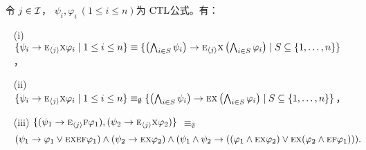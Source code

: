 \begin{lemma}~\label{lem:In2NI}
	令 $j\in {\cal I}$， $\psi_i,\varphi_i~(1\le i\le n)$为 $\textrm{CTL}$公式。有：
	\begin{itemize}
		\item[(i)] $\{\psi_i\rightarrow \textsc{e}_{{\langle{j}\rangle}} \textsc{x} \varphi_i \mid 1\le i\le n\}\equiv 
		\{\left(\bigwedge_{i\in S}\psi_i\right)\rightarrow \textsc{e}_{{\langle{j}\rangle}} \textsc{x} \left(\bigwedge_{i\in S}\varphi_i\right)\mid S\subseteq\{1,\dots, n\}\}$，
		
		\item[(ii)] $\{\psi_i\rightarrow \textsc{e}_{{\langle{j}\rangle}} \textsc{x} \varphi_i \mid 1\le i\le n\}\equiv_\emptyset
		\{\left(\bigwedge_{i\in S}\psi_i\right)\rightarrow \textsc{e} \textsc{x} \left(\bigwedge_{i\in S}\varphi_i\right)\mid S\subseteq\{1,\dots, n\}\}$，
		
		\item[(iii)] $\{(\psi_1 \rightarrow \textsc{e}_{{\langle{j}\rangle}}\textsc{f} \varphi_1), (\psi_2 \rightarrow \textsc{e}_{{\langle{j}\rangle}}\textsc{x} \varphi_2)\}$
		$\equiv_\emptyset$ 
		\begin{equation*}
			(\psi_1 \rightarrow \varphi_1 \vee \textsc{e} \textsc{x} \textsc{e} \textsc{f} \varphi_1)
			\wedge (\psi_2 \rightarrow \textsc{e} \textsc{x} \varphi_2)
			\wedge (\psi_1 \wedge \psi_2 \rightarrow ((\varphi_1 \wedge \textsc{e} \textsc{x} \varphi_2) \vee \textsc{e} \textsc{x} (\varphi_2 \wedge \textsc{e} \textsc{f} \varphi_1))).
		\end{equation*}
	\end{itemize}
\end{lemma}

